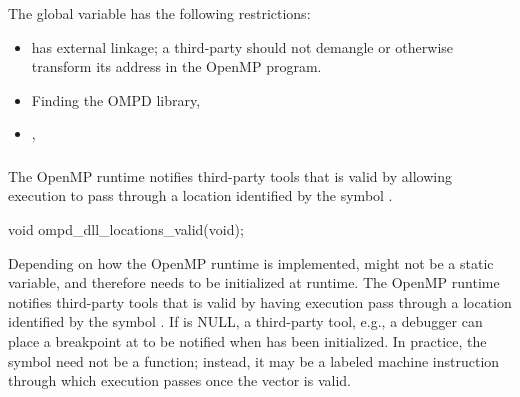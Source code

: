 \restrictions
The   global variable has the following restrictions:

\begin{itemize}
\item {} has external  linkage; a 
      third-party should not demangle or otherwise transform its 
      address in the OpenMP program.
\end{itemize}

\crossreferences
\begin{itemize}
\item
  Finding the OMPD library, 
\item
  , 
\end{itemize}

\subsubsection{}
\label{subsubsec:ompd_dll_locations_valid}

\summary
The OpenMP runtime notifies third-party tools that 
is valid by allowing execution to pass through a location identified
by the symbol .


\begin{cspecific}
\begin{ompSyntax}
void ompd_dll_locations_valid(void);
\end{ompSyntax}
\end{cspecific}


\descr
Depending on how the OpenMP runtime is
implemented,  might not be a static
variable, and therefore needs to be initialized at runtime.  The
OpenMP runtime notifies third-party tools
that  is valid by having execution pass
through a location identified by the
symbol .
If  is NULL, a third-party tool, e.g., a
debugger can place a breakpoint at 
to be notified when  has been initialized.
In practice, the symbol  need not be
a function; instead, it may be a labeled machine instruction through
which execution passes once the vector is valid.

